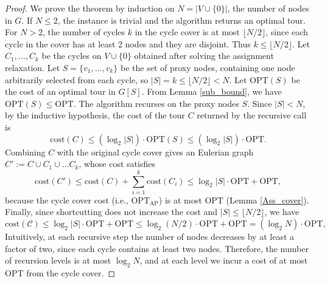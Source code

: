 \documentclass[12pt]{report}
\theoremstyle{definition}
\begin{document}
\begin{proof}
We prove the theorem by induction on $N = |V \cup \{0\}|$, the number of nodes in $G$. If $N \leq 2$, the instance is trivial and the algorithm returns an optimal tour. For $N > 2$, the number of cycles $k$ in the cycle cover is at most $\lfloor N/2 \rfloor$, since each cycle in the cover has at least 2 nodes and they are disjoint. Thus $k \leq \lfloor N/2 \rfloor$. Let $C_1, \dots, C_k$ be the cycles on $V \cup \{0\}$ obtained after solving the assignment relaxation. Let $S=\{v_1, \dots, v_k\}$ be the set of proxy nodes, containing one node arbitrarily selected from each cycle, so $|S| = k \leq \lfloor N/2 \rfloor < N$. Let $\mathrm{OPT}(S)$ be the cost of an optimal tour in $G[S]$. From Lemma \ref{sub_bound}, we have \(\mathrm{OPT}(S) \leq \mathrm{OPT}\). The algorithm recurses on the proxy nodes $S$. Since $|S| < N$, by the inductive hypothesis, the cost of the tour $C$ returned by the recursive call is
\[ 
\mathrm{cost}(C) \leq (\log_2 |S|) \cdot \mathrm{OPT}(S) \leq (\log_2 |S|) \cdot \mathrm{OPT}. 
\] 
Combining $C$ with the original cycle cover gives an Eulerian graph \( C' := C \cup C_1 \cup \dots C_k\), whose cost satisfies 
\[
    \mathrm{cost}(C') \le \mathrm{cost}(C) + \sum_{i=1}^k \mathrm{cost}(C_i) \le \log_2 |S| \cdot \mathrm{OPT} + \mathrm{OPT},
\]
because the cycle cover cost (i.e., $\mathrm{OPT}_{\mathrm{AP}}$) is at most $\mathrm{OPT}$ (Lemma \ref{Ass_cover}). Finally, since shortcutting does not increase the cost and $|S| \le \lfloor N/2 \rfloor$, we have
\[
     \mathrm{cost}(\mathcal{C}) \le \log_2 |S| \cdot \mathrm{OPT} + \mathrm{OPT} \le \log_2 (N/2) \cdot \mathrm{OPT} + \mathrm{OPT} = (\log_2 N) \cdot \mathrm{OPT},
\]
Intuitively, at each recursive step the number of nodes decreases by at least a factor of two, since each cycle contains at least two nodes. Therefore, the number of recursion levels is at most $\log_2 N$, and at each level we incur a cost of at most $\mathrm{OPT}$ from the cycle cover.
\end{proof}
\end{document}
